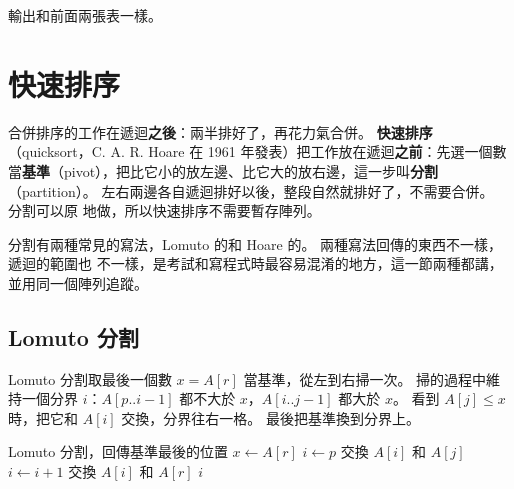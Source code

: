 
輸出和前面兩張表一樣。

\section{快速排序}
\label{sec:so-quick}

合併排序的工作在遞迴\textbf{之後}：兩半排好了，再花力氣合併。 \textbf{快速排序}
（quicksort，C. A. R. Hoare 在 1961 年發表）把工作放在遞迴\textbf{之前}：先選一個數
當\textbf{基準}（pivot），把比它小的放左邊、比它大的放右邊，這一步叫\textbf{分割}
（partition）。 左右兩邊各自遞迴排好以後，整段自然就排好了，不需要合併。 分割可以原
地做，所以快速排序不需要暫存陣列。

分割有兩種常見的寫法，Lomuto 的和 Hoare 的。 兩種寫法回傳的東西不一樣，遞迴的範圍也
不一樣，是考試和寫程式時最容易混淆的地方，這一節兩種都講，並用同一個陣列追蹤。

\subsection{Lomuto 分割}

Lomuto 分割取最後一個數 $x = A[r]$ 當基準，從左到右掃一次。 掃的過程中維持一個分界
$i$：$A[p..i-1]$ 都不大於 $x$，$A[i..j-1]$ 都大於 $x$。 看到 $A[j] \le x$ 時，把它和
$A[i]$ 交換，分界往右一格。 最後把基準換到分界上。

\begin{pseudo}[label=alg:so-lomuto]{Lomuto 分割，回傳基準最後的位置}
    \State $x \gets A[r]$ 
    \State $i \gets p$
            \State 交換 $A[i]$ 和 $A[j]$
            \State $i \gets i + 1$
        \EndIf
    \EndFor
    \State 交換 $A[i]$ 和 $A[r]$
    \State \Return $i$
\EndFunction
\end{pseudo}

